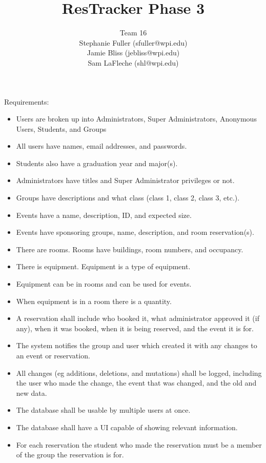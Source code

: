 \documentclass{article}
\title{ResTracker Phase 3}
\author{Team 16\\Stephanie Fuller (sfuller@wpi.edu)\\Jamie Bliss (jebliss@wpi.edu)\\Sam
LaFleche (shl@wpi.edu)}
\begin{document}
\maketitle


\section{}
Requirements:

\begin{itemize}
\item Users are broken up into Administrators, Super Administrators, Anonymous Users, Students, and Groups
\item All users have names, email addresses, and passwords.
\item Students also have a graduation year and major(s).
\item Administrators have titles and Super Administrator privileges or not. 
\item Groups have descriptions and what class (class 1, class 2, class 3, etc.).
\item Events have a name, description, ID, and expected size.
\item Events have sponsoring groups, name, description, and room reservation(s).
\item There are rooms. Rooms have buildings, room numbers, and occupancy.
\item There is equipment. Equipment is a type of equipment.
\item Equipment can be in rooms and can be used for events.
\item When equipment is in a room there is a quantity.
\item A reservation shall include who booked it, what administrator
approved it (if any), when it was booked, when it is being reserved,
and the event it is for.
\item The system notifies the group and user which created it with any
changes to an event or reservation.
\item All changes (eg additions, deletions, and mutations) shall be
logged, including the user who made the change, the event that was
changed, and the old and new data.
\item The database shall be usable by multiple users at once.
\item The database shall have a UI capable of showing relevant information.
\item For each reservation the student who made the reservation must
be a member of the group the reservation is for.

\end{itemize}
\end{document}
